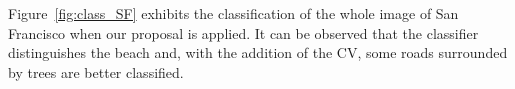 \documentclass[journal]{IEEEtran}
\begin{document}
Figure~\ref{fig:class_SF} exhibits the classification of the whole image of San Francisco when our proposal is applied. It can be observed that the classifier distinguishes the beach and, with the addition of the CV, some roads surrounded by trees are better classified.

\begin{figure}[hbt]
	\centering
	
	

\end{figure}
\end{document}
